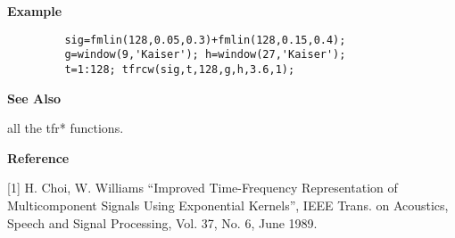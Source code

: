 {\bf \large {}\selectfont Example}
\begin{verbatim}
         sig=fmlin(128,0.05,0.3)+fmlin(128,0.15,0.4);  
         g=window(9,'Kaiser'); h=window(27,'Kaiser'); 
         t=1:128; tfrcw(sig,t,128,g,h,3.6,1);
\end{verbatim}
\vspace*{.5cm}

{\bf \large {}\selectfont See Also}\\
\hspace*{1.5cm}
\begin{minipage}[t]{13.5cm}
all the {\ty tfr*} functions.
\end{minipage}
\vspace*{.5cm}


{\bf \large {}\selectfont Reference}\\
\hspace*{1.5cm}
\begin{minipage}[t]{13.5cm}
[1] H. Choi, W. Williams ``Improved Time-Frequency Representation of
Multicomponent Signals Using Exponential Kernels'', IEEE Trans. on
Acoustics, Speech and Signal Processing, Vol. 37, No. 6, June 1989.
\end{minipage}

